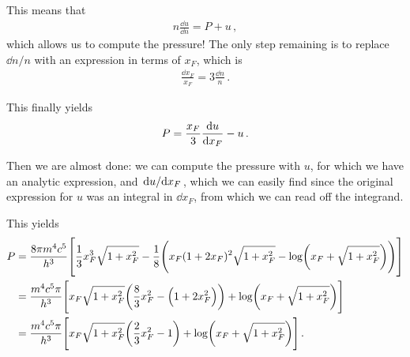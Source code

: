 \documentclass[main.tex]{subfiles}
\begin{document}
This means that 
%
\begin{align}
n \frac{\dd{u}}{ \dd{n}} = P + u
\,,
\end{align}
%
which allows us to compute the pressure! 
The only step remaining is to replace \(\dd{n} / n\) with an expression in terms of \(x_F\), which is 
%
\begin{align}
\frac{ \dd{x_F}}{x_F} = 3 \frac{ \dd{n}}{n}
\,.
\end{align}

This finally yields 
%
\begin{align}
P = \frac{x_F}{3} \dv{u}{x_F} - u
\,.
\end{align}

Then we are almost done: we can compute the pressure with \(u\), for which we have an analytic expression, and \(\dv*{u}{x_F}\), which we can easily find since the original expression for \(u\) was an integral in \(\dd{x_F}\), from which we can read off the integrand. 

This yields 
%
\begin{align}
P &= \frac{8 \pi m^4 c^{5}}{h^3} \qty[ 
    \frac{1}{3} x_F^3 \sqrt{1 + x_F^2 } 
    - \frac{1}{8} \qty(x_F (1 + 2 x_F)^2 \sqrt{1 + x_F^2} 
    - \log(x_F + \sqrt{1 + x_F^2}))
]  \\
&= \frac{m^4 c^{5} \pi }{h^3}
\qty[
    x_F \sqrt{1 + x_F^2}
    \qty( \frac{8}{3} x_F^2 - \qty(1 + 2 x_F^2))
    + \log(x_F + \sqrt{1 + x_F^2})
]  \\
&= \frac{m^4 c^{5} \pi }{h^3} \qty[
    x_F \sqrt{1+ x_F^2} 
    \qty( \frac{2}{3} x_F^2 - 1)
    +
    \log(x_F + \sqrt{1 + x_F^2})
]
\,.
\end{align}
\end{document}
